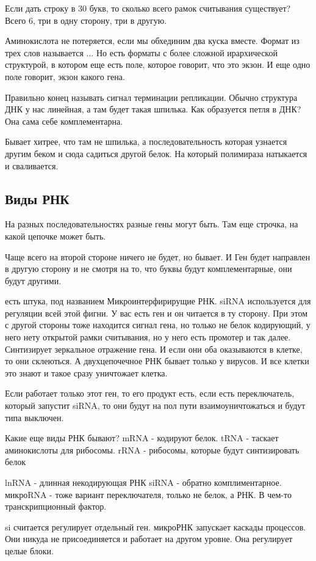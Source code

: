 Если дать строку в 30 букв, то сколько всего рамок считывания существует?
Всего 6, три в одну сторону, три в другую.

Аминокислота не потеряется, если мы обхединим
два куска вместе. Формат из трех слов называется ...
Но есть форматы с более сложной ирархической структурой,
в котором еще есть поле, которое говорит, что это экзон.
И еще одно поле говорит, экзон какого гена.

Правильно конец называть сигнал терминации репликации. Обычно
структура ДНК у нас линейная, а там будет
такая шпилька. Как образуется петля в ДНК? Она
сама себе комплементарна.

Бывает хитрее, что там не шпилька, а последовательность которая
узнается другим беком и сюда садиться другой белок.
На который полимираза натыкается и сваливается.

\subsection{Виды РНК}
На разных последовательностях разные гены могут быть. Там еще строчка,
на какой цепочке может быть.

Чаще всего на второй стороне ничего не будет, но бывает. И Ген будет
направлен в другую сторону и не смотря на то, что буквы будут
комплементарные, они будут другими.

есть штука, под названием Микроинтерфирирущие РНК.
siRNA используется для регуляции всей этой фигни. У вас есть
ген и он читается в ту сторону. При этом с другой стороны тоже
находится сигнал гена, но только не белок кодирующий, у него нету
открытой рамки считывания, но у него есть промотер и так далее.
Синтизирует зеркальное отражение гена. И если
они оба оказываются в клетке, то они склеються. А двухцепочечное
РНК бывает только у вирусов. И все клетки это знают и такое
сразу уничтожает клетка.

Если работает только этот ген, то его продукт есть, если
есть переключатель, который запустит siRNA, то они будут на пол пути
взаимоуничтожаться и будут типа выключен.

Какие еще виды РНК бывают?
mRNA - кодируют белок. 
tRNA - таскает аминокислоты для рибосомы. 
rRNA - рибосомы, которые будут синтизировать белок

lnRNA - длинная некодирующая РНК
siRNA - обратно комплиментарное. 
микроRNA  - тоже вариант переключателя, только не белок, а РНК. В чем-то транскрипционный фактор. 

si считается регулирует отдельный ген. 
микроРНК запускает каскады процессов. Они никуда не присоединяется и работает на другом 
уровне. Она регулирует целые блоки. 

